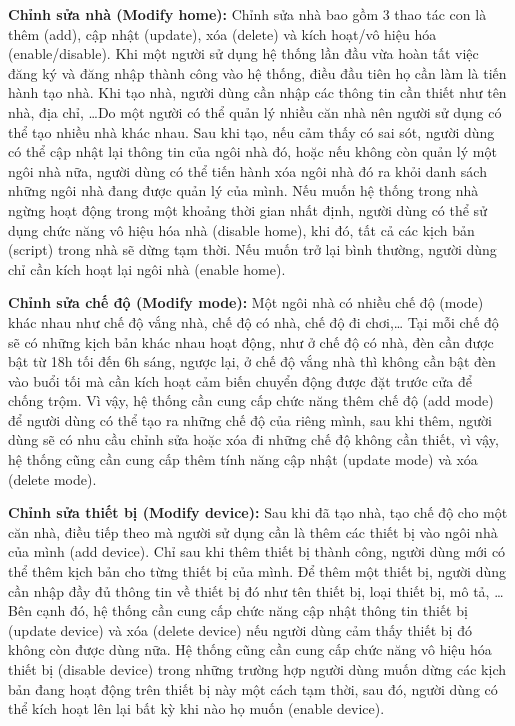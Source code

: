 \documentclass[12pt,a4paper,oneside]{extbook}
\begin{document}
\textbf{Chỉnh sửa nhà (Modify home):} Chỉnh sửa nhà bao gồm 3 thao tác con là thêm (add), cập nhật (update), xóa (delete) và kích hoạt/vô hiệu hóa (enable/disable). Khi một người sử dụng hệ thống lần đầu vừa hoàn tất việc đăng ký và đăng nhập thành công vào hệ thống, điều đầu tiên họ cần làm là tiến hành tạo nhà. Khi tạo nhà, người dùng cần nhập các thông tin cần thiết như tên nhà, địa chỉ, …Do một người có thể quản lý nhiều căn nhà nên người sử dụng có thể tạo nhiều nhà khác nhau. Sau khi tạo, nếu cảm thấy có sai sót, người dùng có thể cập nhật lại thông tin của ngôi nhà đó, hoặc nếu không còn quản lý một ngôi nhà nữa, người dùng có thể tiến hành xóa ngôi nhà đó ra khỏi danh sách những ngôi nhà đang được quản lý của mình. Nếu muốn hệ thống trong nhà ngừng hoạt động trong một khoảng thời gian nhất định, người dùng có thể sử dụng chức năng vô hiệu hóa nhà (disable home), khi đó, tất cả các kịch bản (script) trong nhà sẽ dừng tạm thời. Nếu muốn trở lại bình thường, người dùng chỉ cần kích hoạt lại ngôi nhà (enable home).

\textbf{Chỉnh sửa chế độ (Modify mode):} Một ngôi nhà có nhiều chế độ (mode) khác nhau như chế độ vắng nhà, chế độ có nhà, chế độ đi chơi,\dots\hspace{0mm} Tại mỗi chế độ sẽ có những kịch bản khác nhau hoạt động, như ở chế độ có nhà, đèn cần được bật từ 18h tối đến 6h sáng, ngược lại, ở chế độ vắng nhà thì không cần bật đèn vào buổi tối mà cần kích hoạt cảm biến chuyển động được đặt trước cửa để chống trộm. Vì vậy, hệ thống cần cung cấp chức năng thêm chế độ (add mode) để người dùng có thể tạo ra những chế độ của riêng mình, sau khi thêm, người dùng sẽ có nhu cầu chỉnh sửa hoặc xóa đi những chế độ không cần thiết, vì vậy, hệ thống cũng cần cung cấp thêm tính năng cập nhật (update mode) và xóa (delete mode).

\textbf{Chỉnh sửa thiết bị (Modify device):} Sau khi đã tạo nhà, tạo chế độ cho một căn nhà, điều tiếp theo mà người sử dụng cần là thêm các thiết bị vào ngôi nhà của mình (add device). Chỉ sau khi thêm thiết bị thành công, người dùng mới có thể thêm kịch bản cho từng thiết bị của mình. Để thêm một thiết bị, người dùng cần nhập đầy đủ thông tin về thiết bị đó như tên thiết bị, loại thiết bị, mô tả, …Bên cạnh đó, hệ thống cần cung cấp chức năng cập nhật thông tin thiết bị (update device) và xóa (delete device) nếu người dùng cảm thấy thiết bị đó không còn được dùng nữa. Hệ thống cũng cần cung cấp chức năng vô hiệu hóa thiết bị (disable device) trong những trường hợp người dùng muốn dừng các kịch bản đang hoạt động trên thiết bị này một cách tạm thời, sau đó, người dùng có thể kích hoạt lên lại bất kỳ khi nào họ muốn (enable device).
\end{document}
